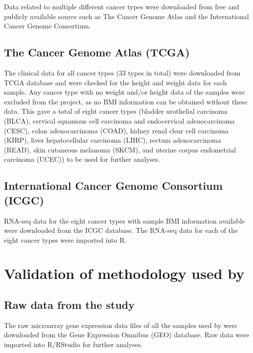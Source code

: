 Data related to multiple different cancer types were downloaded from free and publicly available source such as The Cancer Genome Atlas and the International Cancer Genome Consortium.

\subsection{The Cancer Genome Atlas (TCGA)}
\label{subsec:tcga}

The clinical data for all cancer types (33 types in total) were downloaded from TCGA database and were checked for the height and weight data for each sample.
Any cancer type with no weight and/or height data of the samples were excluded from the project, as no BMI information can be obtained without these data.
This gave a total of eight cancer types (bladder urothelial carcinoma (BLCA), cervical squamous cell carcinoma and endocervical adenocarcinoma (CESC), colon adenocarcinoma (COAD), kidney renal clear cell carcinoma (KIRP), liver hepatocellular carcinoma (LIHC), rectum adenocarcinoma (READ), skin cutaneous melanoma (SKCM), and uterine corpus endometrial carcinoma (UCEC)) to be used for further analyses.

\subsection{International Cancer Genome Consortium (ICGC)}
\label{subsec:icgc}

RNA-seq data for the eight cancer types with sample BMI information available were downloaded from the ICGC database.
The RNA-seq data for each of the eight cancer types were imported into R.

\section{Validation of methodology used by \citet{Creighton2012}}
\label{sec:methodvalidation}

\subsection{Raw data from the \citet{Creighton2012} study}
\label{subsec:rawdatacr}

The raw microarray gene expression data files of all the samples used by \citet{Creighton2012} were downloaded from the Gene Expression Omnibus (GEO) database.
Raw data were imported into R/RStudio for further analyses.


